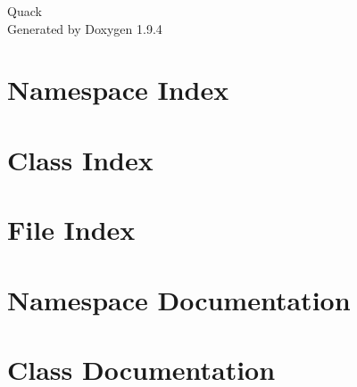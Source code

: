 \documentclass[twoside]{book}
\newcommand{\+}{\discretionary{\mbox{\scriptsize$\hookleftarrow$}}{}{}}
\newcommand{\clearemptydoublepage}{%
    \newpage{\pagestyle{empty}\cleardoublepage}%
  }
\begin{document}
  \raggedbottom
    \hypersetup{pageanchor=false,
                bookmarksnumbered=true,
                pdfencoding=unicode
               }
  \begin{titlepage}
  \vspace*{7cm}
  \begin{center}%
  {\Large Quack}\\
  \vspace*{1cm}
  {\large Generated by Doxygen 1.9.4}\\
  \end{center}
  \end{titlepage}
  \clearemptydoublepage
  \tableofcontents
  \clearemptydoublepage
  \hypersetup{pageanchor=true}
\chapter{Namespace Index}

\chapter{Class Index}

\chapter{File Index}

\chapter{Namespace Documentation}







\chapter{Class Documentation}















\end{document}
